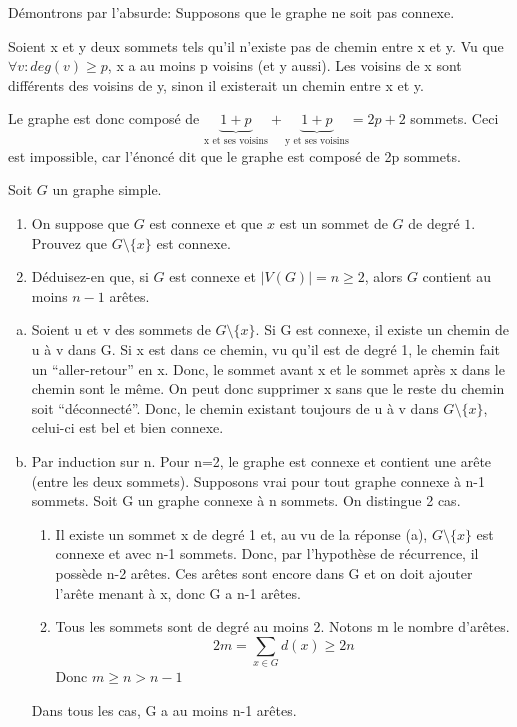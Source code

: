 Démontrons par l'absurde: Supposons que le graphe ne soit pas connexe.

Soient x et y deux sommets tels qu'il n'existe pas de chemin entre x et y. Vu que $\forall v: deg(v)\geq p$, x a au moins p voisins (et y aussi). Les voisins de x sont différents des voisins de y, sinon il existerait un chemin entre x et y.

Le graphe est donc composé de $\underbrace{1+p}_{\text{x et ses voisins}}+\underbrace{1+p}_{\text{y et ses voisins}} = 2p+2$ sommets. Ceci est impossible, car l'énoncé dit que le graphe est composé de 2p sommets.

\newpage


\begin{exo}
Soit $G$ un graphe simple.
\begin{enumerate}
\item On suppose que $G$ est connexe et que $x$ est un sommet de $G$ de degr\'e $1$. Prouvez que $G\setminus\{x\}$ est connexe.
\item D\'eduisez-en que, si $G$ est connexe et $|V(G)|=n\geq 2$, alors $G$ contient au moins $n-1$ ar\^etes.
\end{enumerate}
\end{exo}

\begin{enumerate}[a)]
\item Soient u et v des sommets de $G\setminus\{x\}$. Si G est connexe, il existe un chemin de u à v dans G. Si x est dans ce chemin, vu qu'il est de degré 1, le chemin fait un ``aller-retour'' en x. Donc, le sommet avant x et le sommet après x dans le chemin sont le même. On peut donc supprimer x sans que le reste du chemin soit ``déconnecté''. Donc, le chemin existant toujours de u à v dans $G\setminus\{x\}$, celui-ci est bel et bien connexe.
\item Par induction sur n. Pour n=2, le graphe est connexe et contient une arête (entre les deux sommets). Supposons vrai pour tout graphe connexe à n-1 sommets. Soit G un graphe connexe à n sommets. On distingue 2 cas.
	\begin{enumerate}[1.]
	\item Il existe un sommet x de degré 1 et, au vu de la réponse (a), $G \setminus \{x\}$ est connexe et avec n-1 sommets. Donc, par l'hypothèse de récurrence, il possède n-2 arêtes. Ces arêtes sont encore dans G et on doit ajouter l'arête menant à x, donc G a n-1 arêtes.
	\item Tous les sommets sont de degré au moins 2. Notons m le nombre d'arêtes. $$ 2m = \sum_{x \in G} d(x) \geq 2n $$
	Donc $m \geq n > n-1$
	\end{enumerate}

Dans tous les cas, G a au moins n-1 arêtes.
\end{enumerate}

